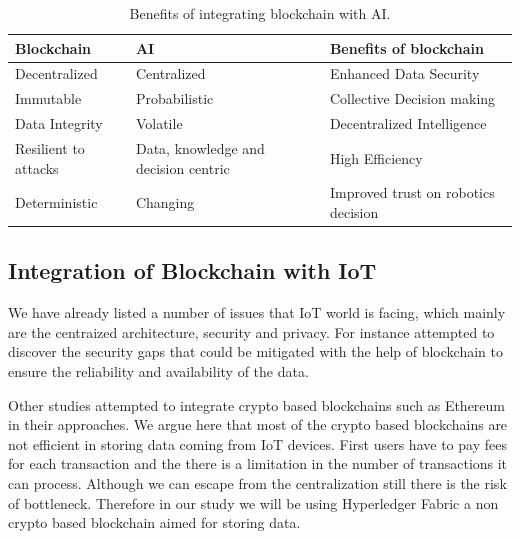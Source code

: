 \begin{table}[hbt!]

    
    \begin{tabular}{  p{4.4cm}  p{4.4cm}  p{5.4cm} }
      
\textbf{Blockchain}      
& \textbf{AI}   
& \textbf{Benefits of blockchain} \\\midrule
Decentralized & Centralized        
& Enhanced Data Security \\\hline

Immutable & Probabilistic       
& Collective Decision making \\\hline


Data Integrity & Volatile      
& Decentralized Intelligence \\\hline

Resilient to attacks & Data, knowledge and decision centric     
& High Efficiency \\\hline

Deterministic  &
Changing      
& Improved trust on robotics decision \\
        \bottomrule
    \end{tabular}
    \caption{Benefits of integrating blockchain with AI.}
    \label{crouch}
\end{table}

\subsection{Integration of Blockchain with IoT}

We have already listed a number of issues that IoT world is facing, which mainly are the centraized architecture, security and privacy. For instance \cite{inbook223ris} attempted to discover the security gaps that could be mitigated with the help of blockchain to ensure the reliability and availability of the data.

Other studies \cite{8598784} attempted to integrate crypto based blockchains such as Ethereum in their approaches. We argue here that most of the crypto based blockchains are not efficient in storing data coming from IoT devices. First users have to pay fees for each transaction and the there is a limitation in the number of transactions it can process. Although we can escape from the centralization still there is the risk of bottleneck. Therefore in our study we will be using Hyperledger Fabric a non crypto based blockchain aimed for storing data. 

































